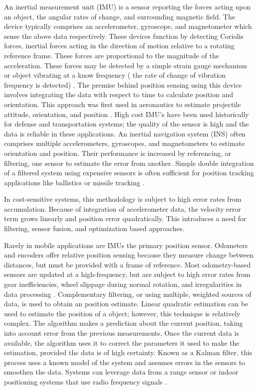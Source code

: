 \documentclass{article}
\begin{document}
An inertial measurement unit (IMU) is a sensor reporting the forces acting upon an object, the angular rates of change, and surrounding magnetic field. The device typically comprises an accelerometer, gyroscope, and magnetometer which sense the above data respectively. These devices function by detecting Coriolis forces, inertial forces acting in the direction of motion relative to a rotating reference frame. These forces are proportional to the magnitude of the acceleration. These forces may be detected by a simple strain gauge mechanism or object vibrating at a know frequency ( the rate of change of vibration frequency is detected) \cite{barshan_199354}. The premise behind position sensing using this device involves integrating the data with respect to time to calculate position and orientation. This approach was first used in aeronautics to estimate projectile attitude, orientation, and position \cite{agard_1989}. High cost IMU's have been used historically for defense and transportation systems; the quality of the sensor is high and the data is reliable in these applications. An inertial navigation system (INS) often comprises multiple accelerometers, gyroscopes, and magnetometers to estimate orientation and position. Their performance is increased by referencing, or filtering, one sensor to estimate the error from another. Simple double integration of a filtered system using expensive sensors is often sufficient for position tracking applications like ballistics or missile tracking \cite{barshan_199354}.

In cost-sensitive systems, this methodology is subject to high error rates from accumulation. Because of integration of accelerometer data, the velocity error term grows linearly and position error quadratically. This introduces a need for filtering, sensor fusion, and optimization based approaches.

	Rarely in mobile applications are IMUs the primary position sensor. Odometers and encoders offer relative position sensing because they measure change between distances, but must be provided with a frame of reference. Most odometry-based sensors are updated at a high-frequency, but are subject to high error rates from gear inefficiencies, wheel slippage during normal rotation, and irregularities in data processing \cite{linchevski_addressing_2007}. Complementary filtering, or using multiple, weighted sources of data, is used to obtain an position estimate. Linear quadratic estimation can be used to estimate the position of a object; however, this technique is relatively complex. The algorithm makes a prediction about the current position, taking into account error from the previous measurements. Once the current data is available, the algorithm uses it to correct the parameters it used to make the estimation, provided the data is of high certainty. Known as a Kalman filter, this process uses a known model of the system and assumes errors in the sensors to smoothen the data. Systems can leverage data from a range sensor \cite{teslic_ekf_2011} or indoor positioning systems that use radio frequency signals \cite{marquez_uwb_2017}.
\end{document}
